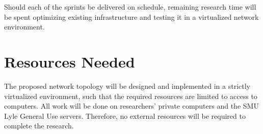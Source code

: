 \documentclass{sigcomm-alternate}
\begin{document}
Should each of the sprints be delivered on schedule, remaining research time will be spent optimizing existing infrastructure and testing it in a virtualized network environment.


\section{Resources Needed}
The proposed network topology will be designed and implemented in a strictly virtualized environment, such that the required resources are limited to access to computers. All work will be done on researchers' private computers and the SMU Lyle General Use servers. Therefore, no external resources will be required to complete the research.







\end{document}
